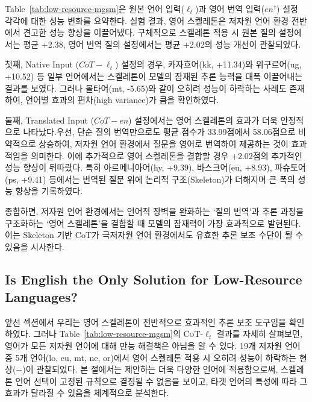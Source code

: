 Table~\ref{tab:low-resource-mgsm}은 원본 언어 입력($\ell_t$)과 영어 번역 입력($en^{\dagger}$) 설정 각각에 대한 성능 변화를 요약한다. 실험 결과, 영어 스켈레톤은 저자원 언어 환경 전반에서 견고한 성능 향상을 이끌어냈다. 구체적으로 스켈레톤 적용 시 원본 질의 설정에서는 평균 +2.38, 영어 번역 질의 설정에서는 평균 +2.02의 성능 개선이 관찰되었다.

첫째, Native Input ($CoT-\ell_t$) 설정의 경우, 카자흐어(kk, +11.34)와 위구르어(ug, +10.52) 등 일부 언어에서는 스켈레톤이 모델의 잠재된 추론 능력을 대폭 이끌어내는 결과를 보였다. 그러나 몰타어(mt, -5.65)와 같이 오히려 성능이 하락하는 사례도 존재하여, 언어별 효과의 편차(high variance)가 큼을 확인하였다.

둘째, Translated Input ($CoT-en$) 설정에서는 영어 스켈레톤의 효과가 더욱 안정적으로 나타났다.우선, 단순 질의 번역만으로도 평균 점수가 33.99점에서 58.06점으로 비약적으로 상승하여, 저자원 언어 환경에서 질문을 영어로 번역하여 제공하는 것이 효과적임을 의미한다. 이에 추가적으로 영어 스켈레톤을 결합할 경우 +2.02점의 추가적인 성능 향상이 뒤따랐다. 특히 아르메니아어(hy, +9.39), 바스크어(eu, +8.93), 파슈토어(ps, +9.41) 등에서는 번역된 질문 위에 논리적 구조(Skeleton)가 더해지며 큰 폭의 성능 향상을 기록하였다. 

종합하면, 저자원 언어 환경에서는 언어적 장벽을 완화하는 `질의 번역'과 추론 과정을 구조화하는 `영어 스켈레톤'을 결합할 때 모델의 잠재력이 가장 효과적으로 발현된다. 이는 Skeleton 기반 CoT가 극저자원 언어 환경에서도 유효한 추론 보조 수단이 될 수 있음을 시사한다.

\subsection{Is English the Only Solution for Low-Resource Languages?}
\label{sec:low-resource-nonen}

앞선 섹션에서 우리는 영어 스켈레톤이 전반적으로 효과적인 추론 보조 도구임을 확인하였다. 그러나 Table~\ref{tab:low-resource-mgsm}의 \textsc{CoT-$\ell_t$} 결과를 자세히 살펴보면, 영어가 모든 저자원 언어에 대해 만능 해결책은 아님을 알 수 있다. 19개 저자원 언어 중 5개 언어(lo, eu, mt, ne, or)에서 영어 스켈레톤 적용 시 오히려 성능이 하락하는 현상(\textcolor{blue}{$-$})이 관찰되었다. 본 절에서는 제안하는  더욱 다양한 언어에 적용함으로써, 스켈레톤 언어 선택이 고정된 규칙으로 결정될 수 없음을 보이고, 타겟 언어의 특성에 따라 그 효과가 달라질 수 있음을 체계적으로 분석한다.
%

